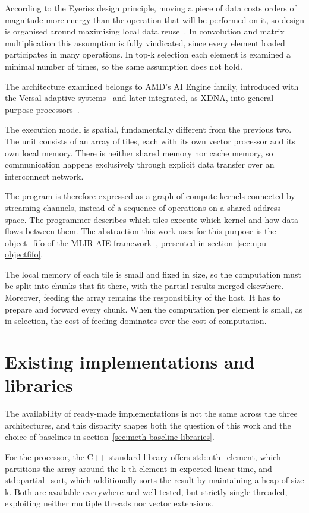 According to the Eyeriss design principle, moving a piece of data costs orders
of magnitude more energy than the operation that will be performed on it, so
design is organised around maximising local data reuse~\cite{chen2016eyeriss}.
In convolution and matrix multiplication this assumption is fully vindicated,
since every element loaded participates in many operations. In top-k selection
each element is examined a minimal number of times, so the same assumption does
not hold.

The architecture examined belongs to AMD's AI Engine family, introduced with
the Versal adaptive systems~\cite{amd2021versal} and later integrated, as XDNA,
into general-purpose processors~\cite{amd2024xdna}.

The execution model is spatial, fundamentally different from the previous two.
The unit consists of an array of tiles, each with its own vector processor and
its own local memory. There is neither shared memory nor cache memory, so
communication happens exclusively through explicit data transfer over an
interconnect network.

The program is therefore expressed as a graph of compute kernels connected by
streaming channels, instead of a sequence of operations on a shared address
space. The programmer describes which tiles execute which kernel and how data
flows between them. The abstraction this work uses for this purpose is the
object\_fifo of the MLIR-AIE framework~\cite{mliraie}, presented in
section~\ref{sec:npu-objectfifo}.

The local memory of each tile is small and fixed in size, so the computation
must be split into chunks that fit there, with the partial results merged
elsewhere. Moreover, feeding the array remains the responsibility of the host.
It has to prepare and forward every chunk. When the computation per element is
small, as in selection, the cost of feeding dominates over the cost of
computation.

\section{Existing implementations and libraries}
\label{sec:bg-related}

The availability of ready-made implementations is not the same across the three
architectures, and this disparity shapes both the question of this work and the
choice of baselines in section~\ref{sec:meth-baseline-libraries}.

For the processor, the C++ standard library offers std::nth\_element, which
partitions the array around the k-th element in expected linear time, and
std::partial\_sort, which additionally sorts the result by maintaining a heap
of size k. Both are available everywhere and well tested, but strictly
single-threaded, exploiting neither multiple threads nor vector extensions.

